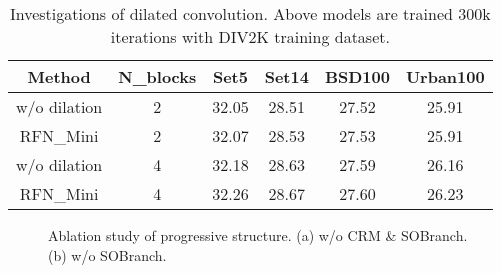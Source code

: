 \documentclass[preprint]{elsarticle}
\begin{document}
\begin{table}[htb]
	\small
	\centering
	\caption{Investigations of dilated convolution. Above models are trained 300k iterations with DIV2K training dataset.}
	\label{tab:ablation-study-multi}
		\begin{tabular}{|c|c|c|c|c|c|}
			\hline
			Method & N\_blocks & Set5 & Set14 & BSD100 & Urban100 \\
			\hline
			w/o dilation & 2 & 32.05 & 28.51 & 27.52 & 25.91 \\
			RFN\_Mini & 2 & 32.07 & 28.53 & 27.53 & 25.91 \\
			\hline
			w/o dilation & 4 & 32.18 & 28.63 & 27.59 & 26.16 \\
			RFN\_Mini & 4 & 32.26 & 28.67 & 27.60 & 26.23 \\
			\hline 
	\end{tabular}
\end{table}

\begin{figure*}[htpb]
	\centering
	\caption{Ablation study of progressive structure. (a) w/o CRM \& SOBranch. (b) w/o SOBranch.}
	\label{fig:ablation-study-progressive-structure}
\end{figure*}
\end{document}
